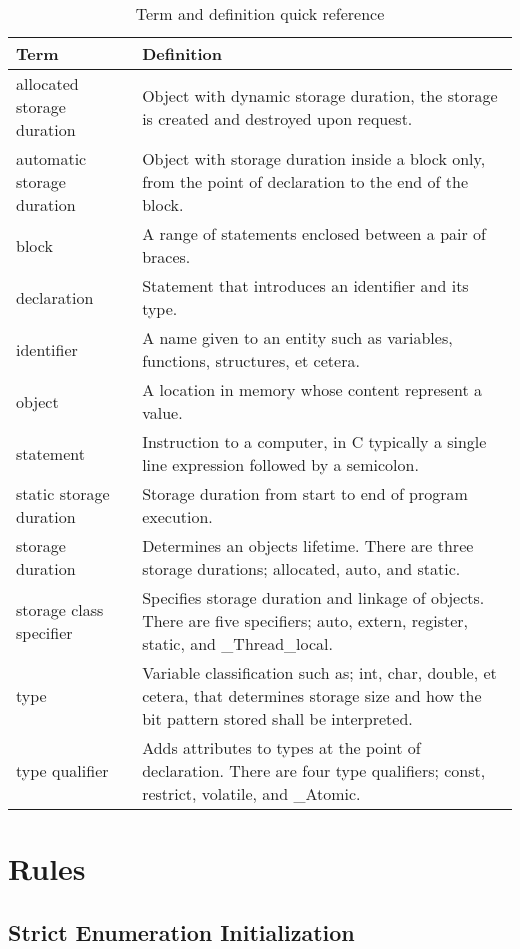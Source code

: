 \documentclass{report}
\newcounter{Rule}
\begin{document}
\begin{table}[h]
\begin{tabularx}{\textwidth}{lX}
\toprule
Term & Definition \\
\midrule
allocated storage duration & Object with dynamic storage duration, the storage is created and destroyed upon request. \\
automatic	storage duration &	Object with storage duration inside a block only, from the point of declaration to the end of the block. \\
block & A range of statements enclosed between a pair of braces. \\
declaration & Statement that introduces an identifier and its type. \\
identifier & A name given to an entity such as variables, functions, structures, et cetera. \\
object & A location in memory whose content represent a value. \\
statement & Instruction to a computer, in C typically a single line expression followed by a semicolon. \\
static storage duration & Storage duration from start to end of program execution. \\
storage duration & Determines an objects lifetime. There are three storage durations; allocated, auto, and static. \\
storage class specifier & Specifies storage duration and linkage of objects. There are five specifiers; auto, extern, register, static, and \_Thread\_local. \\
type & Variable classification such as; int, char, double, et cetera, that determines storage size and how the bit pattern stored shall be interpreted.\\
type qualifier & Adds attributes to types at the point of declaration. There are four type qualifiers; const, restrict, volatile, and \_Atomic. \\
\bottomrule
\end{tabularx}
\caption{Term and definition quick reference}\label{tab:terms-and-defs}    %
\end{table}

\chapter{Rules}

\section{Strict Enumeration Initialization}
\end{document}
